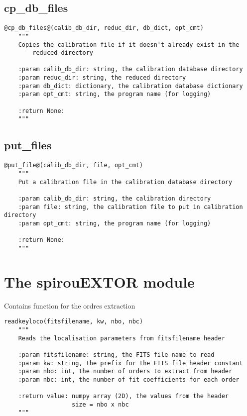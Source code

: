 \vspace{0.5cm}
\subsection{cp\_db\_files}
\begin{lstlisting}[style=pythonstyle]
@cp_db_files@(calib_db_dir, reduc_dir, db_dict, opt_cmt)
    """
    Copies the calibration file if it doesn't already exist in the
        reduced directory

    :param calib_db_dir: string, the calibration database directory
    :param reduc_dir: string, the reduced directory
    :param db_dict: dictionary, the calibration database dictionary
    :param opt_cmt: string, the program name (for logging)

    :return None:
    """
\end{lstlisting}

\vspace{0.5cm}
\subsection{put\_files}
\begin{lstlisting}[style=pythonstyle]
@put_file@(calib_db_dir, file, opt_cmt)
    """
    Put a calibration file in the calibration database directory
    
    :param calib_db_dir: string, the calibration directory 
    :param file: string, the calibration file to put in calibration directory
    :param opt_cmt: string, the program name (for logging)
    
    :return None: 
    """
\end{lstlisting}

\clearpage
\newpage
\section{The spirouEXTOR module}

Contains function for the ordres extraction

\begin{lstlisting}[style=pythonstyle]
readkeyloco(fitsfilename, kw, nbo, nbc)
    """
    Reads the localisation parameters from fitsfilename header

    :param fitsfilename: string, the FITS file name to read
    :param kw: string, the prefix for the FITS file header constant
    :param nbo: int, the number of orders to extract from header
    :param nbc: int, the number of fit coefficients for each order
   
    :return value: numpy array (2D), the values from the header
                   size = nbo x nbc
    """
\end{lstlisting}

